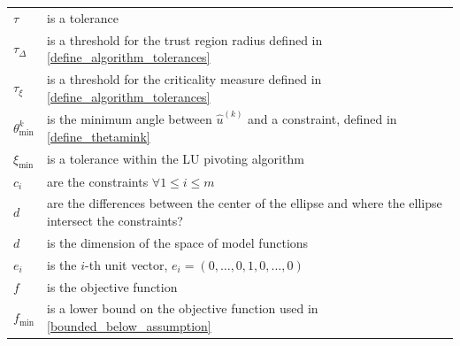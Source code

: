 \documentclass{article}
\theoremstyle{case}
\numberwithin{theorem}{subsection}
\newcommand{\fmin}{f_{\text{min}}}
\newcommand{\huk}{{{\hat u}^{(k)}}}
\newcommand{\thetamink}{{\theta^k_{\textrm{min}}}}
\newcommand{\tolcrit}{\tau_{\xi}}
\newcommand{\tolrad}{\tau_{\Delta}}
\begin{document}
\begin{longtable}{| p{} | p{} |}
$\tau$ & is a tolerance \\ %
$\tolrad$ & is a threshold for the trust region radius defined in \cref{define_algorithm_tolerances} \\ %
$\tolcrit$ & is a threshold for the criticality measure defined in \cref{define_algorithm_tolerances} \\ %
$\thetamink$ & is the minimum angle between $\huk$ and a constraint, defined in \cref{define_thetamink} \\ %
$\xi_{\text{min}}$ & is a tolerance within the LU pivoting algorithm \\ %
$c_i$ & are the constraints $\forall 1 \le i \le m$ \\ %
$d$ & are the differences between the center of the ellipse and where the ellipse intersect the constraints? \\ %
$d$ & is the dimension of the space of model functions \\ %
$e_i$ & is the $i$-th unit vector, $e_i = (0, \ldots, 0, 1, 0, \ldots, 0)$ \\ %
$f$ & is the objective function \\ %
$\fmin$ & is a lower bound on the objective function used in \cref{bounded_below_assumption}\\ %

\end{longtable}
\end{document}
